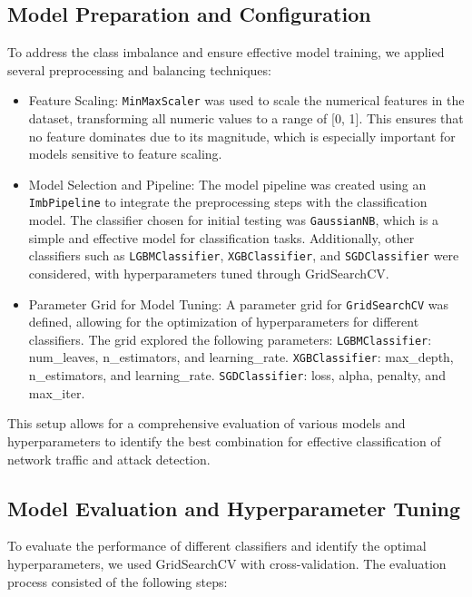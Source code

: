 \documentclass[conference]{IEEEtran}
\begin{document}
	\subsection{Model Preparation and Configuration}
	To address the class imbalance and ensure effective model training, we applied several preprocessing and balancing techniques:
	\begin{itemize}
		\item Feature Scaling: \texttt{MinMaxScaler} was used to scale the numerical features in the dataset, transforming all numeric values to a range of [0, 1]. This ensures that no feature dominates due to its magnitude, which is especially important for models sensitive to feature scaling.
		\item Model Selection and Pipeline: The model pipeline was created using an \texttt{ImbPipeline} to integrate the preprocessing steps with the classification model. The classifier chosen for initial testing was \texttt{GaussianNB}, which is a simple and effective model for classification tasks. Additionally, other classifiers such as \texttt{LGBMClassifier}, \texttt{XGBClassifier}, and \texttt{SGDClassifier} were considered, with hyperparameters tuned through GridSearchCV.
		\item Parameter Grid for Model Tuning: A parameter grid for \texttt{GridSearchCV} was defined, allowing for the optimization of hyperparameters for different classifiers. The grid explored the following parameters:
		\subitem \texttt{LGBMClassifier}: num\_leaves, n\_estimators, and learning\_rate.
		\subitem \texttt{XGBClassifier}: max\_depth, n\_estimators, and learning\_rate.
		\subitem \texttt{SGDClassifier}: loss, alpha, penalty, and max\_iter.
	\end{itemize}
	
	This setup allows for a comprehensive evaluation of various models and hyperparameters to identify the best combination for effective classification of network traffic and attack detection.
	
	\subsection{Model Evaluation and Hyperparameter Tuning}
	To evaluate the performance of different classifiers and identify the optimal hyperparameters, we used GridSearchCV with cross-validation. The evaluation process consisted of the following steps:
	
\end{document}
